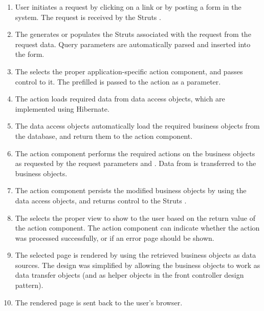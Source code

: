 \begin{enumerate}

  \item User initiates a request by clicking on a link or by posting a 
  form in the system. The request is received by the Struts 
  .
  
  \item The  generates or populates the Struts 
   associated with the request from the request data. 
  Query parameters are automatically parsed and inserted into the form.
  
  \item The  selects the proper 
  application-specific action component, and passes control to it. The 
  prefilled  is passed to the action as a parameter.
  
  \item The action loads required data from data access objects, which 
  are implemented using Hibernate.
  
  \item The data access objects automatically load the required 
  business objects from the database, and return them to the action 
  component.
  
  \item The action component performs the required actions on the 
  business objects as requested by the request parameters and 
  . Data from  is transferred to 
  the business objects.
  
  \item The action component persists the modified business objects by 
  using the data access objects, and returns control to the Struts 
  .
  
  \item The  selects the proper view to show to 
  the user based on the return value of the action component. The 
  action component can indicate whether the action was processed 
  successfully, or if an error page should be shown.
  
  \item The selected  page is rendered by using the 
  retrieved business objects as data sources. The design was 
  simplified by allowing the business objects to work as data transfer 
  objects (and as helper objects in the front controller design 
  pattern).
  
  \item The rendered page is sent back to the user's browser.
  
\end{enumerate}


